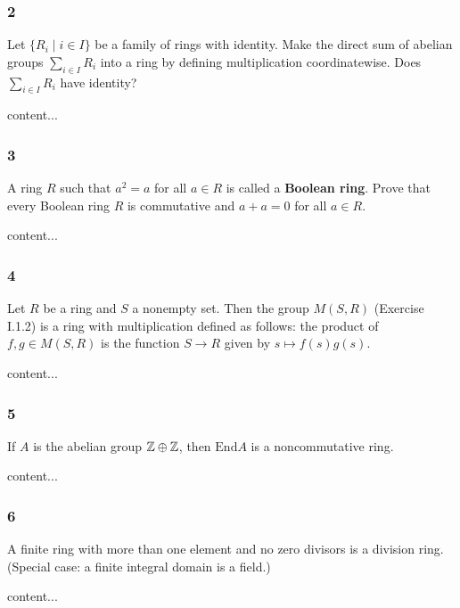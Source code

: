 \subsubsection*{2}
\begin{graybox}
	Let $\{R_i \mid i \in I\}$ be a family of rings with identity. Make the direct sum of abelian groups $\sum_{i \in I} R_i$ into a ring by defining multiplication coordinatewise. Does $\sum_{i \in I}R_i$ have identity?
\end{graybox}
\begin{solution}
	content...
\end{solution}

\subsubsection*{3}
\begin{graybox}
	A ring $R$ such that $a^2 = a$ for all $a \in R$ is called a \textbf{Boolean ring}. Prove that every Boolean ring $R$ is commutative and $a + a = 0$ for all $a \in R$.
\end{graybox}
\begin{solution}
	content...
\end{solution}

\subsubsection*{4}
\begin{graybox}
	Let $R$ be a ring and $S$ a nonempty set. Then the group $M(S,R)$ (Exercise I.1.2) is a ring with multiplication defined as follows: the product of $f, g \in M(S,R)$ is the function $S \to R$ given by $s \mapsto f(s)g(s)$.
\end{graybox}
\begin{solution}
	content...
\end{solution}

\subsubsection*{5}
\begin{graybox}
	If $A$ is the abelian group $\mathbb{Z} \oplus \mathbb{Z}$, then $\text{End} A$ is a noncommutative ring.
\end{graybox}
\begin{solution}
	content...
\end{solution}

\subsubsection*{6}
\begin{graybox}
	A finite ring with more than one element and no zero divisors is a division ring. (Special case: a finite integral domain is a field.)
\end{graybox}
\begin{solution}
	content...
\end{solution}


